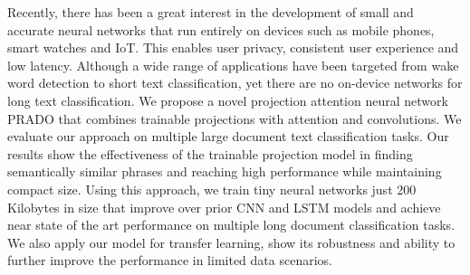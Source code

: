 Recently, there has been a great interest in the development of small and accurate neural networks that run entirely on devices such as mobile phones, smart watches and IoT. This enables user privacy, consistent user experience and low latency. Although a wide range of applications have been targeted from wake word detection to short text classification, yet there are no on-device networks for long text classification. We propose a novel projection attention neural network PRADO that combines trainable projections with attention and convolutions. We evaluate our approach on multiple large document text classification tasks. Our results show the effectiveness of the trainable projection model in finding semantically similar phrases and reaching high performance while maintaining compact size. Using this approach, we train tiny neural networks just 200 Kilobytes in size that improve over prior CNN and LSTM models and achieve near state of the art performance on multiple long document classification tasks. We also apply our model for transfer learning, show its robustness and ability to further improve the performance in limited data scenarios.
